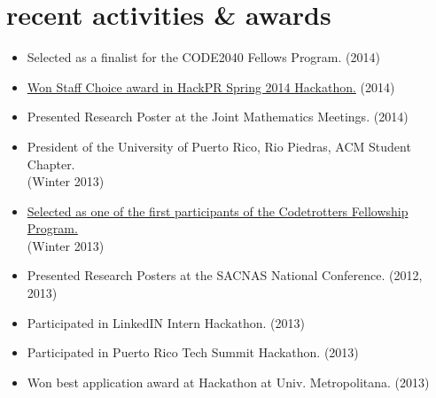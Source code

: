 \documentclass[]{friggeri-cv}
\begin{document}
\section{recent activities \& awards}
\begin{itemize}
\item Selected as a finalist for the CODE2040 Fellows Program. (2014)
\item \href{https://github.com/chrisrodz/gh-backups}{Won Staff Choice award in HackPR Spring 2014 Hackathon.} (2014)
\item Presented Research Poster at the Joint Mathematics Meetings. (2014)
\item President of the University of Puerto Rico, Rio Piedras, ACM Student Chapter. \\ (Winter 2013)
\item \href{http://codetrotters.com}{Selected as one of the first participants of the Codetrotters Fellowship Program.} \\ (Winter 2013)
\item Presented Research Posters at the SACNAS National Conference. (2012, 2013)
\item Participated in LinkedIN Intern Hackathon. (2013)
\item Participated in Puerto Rico Tech Summit Hackathon. (2013)
\item Won best application award at Hackathon at Univ. Metropolitana. (2013)
\end{itemize}
\end{document}
